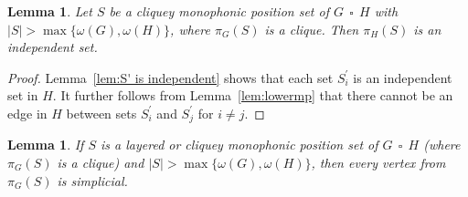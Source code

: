 \documentclass[12pt]{article}
\newtheorem{lemma}[theorem]{Lemma}
\DeclareMathOperator{\cp}{\,\square\,}
\begin{document}
\begin{lemma}\label{cliquey}
    Let $S$ be a cliquey monophonic position set of $G \cp H$ with $|S| > \max \{ \omega (G),\omega (H)\} $, where $\pi _G(S)$ is a clique. Then $\pi _H(S)$ is an independent set.
\end{lemma}
\begin{proof}
Lemma~\ref{lem:S' is independent} shows that each set $S_i^{\prime }$ is an independent set in $H$. It further follows from Lemma~\ref{lem:lowermp} that there cannot be an edge in $H$ between sets $S_i^{\prime}$ and $S_j^{\prime}$ for $i \neq j$.
\end{proof}

\begin{lemma}
\label{lem:simplicial vertices}
If $S$ is a layered or cliquey monophonic position set of $G \cp H$ (where $\pi _G(S)$ is a clique) and $|S| > \max \{ \omega (G),\omega (H)\} $, then every vertex from $\pi _G(S)$ is simplicial.
\end{lemma}
\end{document}

